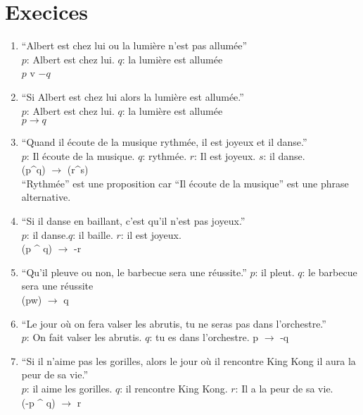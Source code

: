 \documentclass[11pt,a4paper]{article} %
\begin{document}
\section{Execices}
\begin{enumerate}
	\item ``Albert est chez lui ou la lumière n'est pas allumée''\\
		$p$: Albert est chez lui. $q$:  la lumière est allumée\\
		$p$ v $-q$
	\item ``Si Albert est chez lui alors la lumière est allumée.'' \\
		$p$: Albert est chez lui. $q$:  la lumière est allumée\\
		$p \rightarrow q$
	\item ``Quand il écoute de la musique rythmée, il est joyeux et il danse.''\\
		$p$: Il écoute de la musique. $q$: rythmée. $r$: Il est joyeux. $s$: il danse.\\
		(p\^{}q) $\rightarrow$ (r\^{}s)\\
		``Rythmée'' est une proposition car ``Il écoute de la musique'' est une phrase alternative.
	\item ``Si il danse en baillant, c'est qu'il n'est pas joyeux.''\\
		$p$: il danse.$q$: il baille. $r$: il est joyeux.\\
		(p \^{} q) $\rightarrow$ -r
	\item ``Qu'il pleuve ou non, le barbecue sera une réussite.''
		$p$: il pleut. $q$: le barbecue sera une réussite\\
		(pw) $\rightarrow$ q
	\item ``Le jour où on fera valser les abrutis, tu ne seras pas dans l'orchestre.''\\
		$p$: On fait valser les abrutis.  $q$: tu es dans l'orchestre.
		p $\rightarrow$ -q
	\item ``Si il n'aime pas les gorilles, alors le jour où il rencontre King Kong il aura la peur de sa vie.''\\
		$p$: il aime les gorilles. $q$: il rencontre King Kong. $r$: Il a la peur de sa vie.\\
		(-p \^{} q) $\rightarrow$ r
\end{enumerate}
\end{document}
